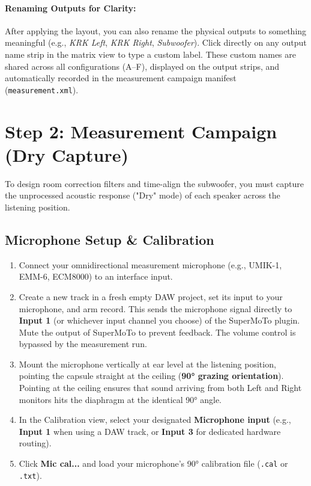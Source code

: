 \documentclass[11pt,a4paper]{article}
\begin{document}
\paragraph{Renaming Outputs for Clarity:}
After applying the layout, you can also rename the physical outputs to something meaningful (e.g., \textit{KRK Left}, \textit{KRK Right}, \textit{Subwoofer}). Click directly on any output name strip in the matrix view to type a custom label. These custom names are shared across all configurations (A--F), displayed on the output strips, and automatically recorded in the measurement campaign manifest (\texttt{measurement.xml}).

\clearpage

\section{Step 2: Measurement Campaign (Dry Capture)}\label{sec:step2}

To design room correction filters and time-align the subwoofer, you must capture the unprocessed acoustic response ("Dry" mode) of each speaker across the listening position.

\subsection{Microphone Setup \& Calibration}
\begin{enumerate}[nosep]
  \item Connect your omnidirectional measurement microphone (e.g., UMIK-1, EMM-6, ECM8000) to an interface input.
  \item Create a new track in a fresh empty DAW project, set its input to your microphone, and arm record. This sends the microphone signal directly to \textbf{Input 1} (or whichever input channel you choose) of the SuperMoTo plugin. Mute the output of SuperMoTo to prevent feedback. The volume control is bypassed by the measurement run.
  \item Mount the microphone vertically at ear level at the listening position, pointing the capsule straight at the ceiling (\textbf{\ang{90} grazing orientation}). Pointing at the ceiling ensures that sound arriving from both Left and Right monitors hits the diaphragm at the identical \ang{90} angle.
  \item In the Calibration view, select your designated \textbf{Microphone input} (e.g., \textbf{Input 1} when using a DAW track, or \textbf{Input 3} for dedicated hardware routing).
  \item Click \textbf{Mic cal...} and load your microphone's \ang{90} calibration file (\texttt{.cal} or \texttt{.txt}).
\end{enumerate}
\end{document}
